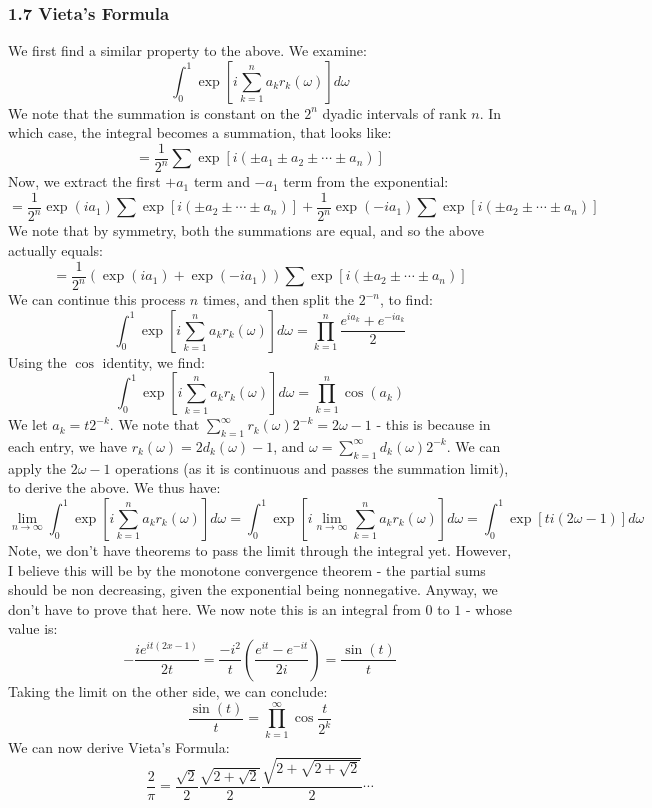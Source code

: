 \documentclass[12pt,a4paper]{article}
\newcommand{\1}[1]{\mathbbm{1}\left\{ #1 \right\}}
\begin{document}
\subsubsection{1.7 Vieta's Formula} We first find a similar property to the above. We examine:
$$
	\int_0^1 \exp\left[i\sum_{k=1}^n a_kr_k(\omega)\right] d\omega
$$
We note that the summation is constant on the $2^n$ dyadic intervals of rank $n$. In which case, the integral becomes a summation, that looks like:
$$
	= \frac{1}{2^n} \sum \exp\left[i\left(\pm a_1 \pm a_2 \pm \cdots \pm a_n\right)\right]
$$
Now, we extract the first $+a_1$ term and $-a_1$ term from the exponential:
$$
	= \frac{1}{2^n} \exp(ia_1) \sum \exp\left[i\left(\pm a_2 \pm \cdots \pm a_n\right)\right] +
	\frac{1}{2^n} \exp(-ia_1) \sum \exp\left[i\left(\pm a_2 \pm \cdots \pm a_n\right)\right]
$$
We note that by symmetry, both the summations are equal, and so the above actually equals:
$$
	= \frac{1}{2^n} \left(\exp(ia_1) + \exp(-ia_1)\right) \sum \exp\left[i\left(\pm a_2 \pm \cdots \pm a_n\right)\right]
$$
We can continue this process $n$ times, and then split the $2^{-n}$, to find:
$$
	\int_0^1 \exp\left[i\sum_{k=1}^n a_kr_k(\omega)\right] d\omega =
	\prod_{k=1}^n \frac{e^{ia_k}+e^{-ia_k}}{2}
$$
Using the $\cos$ identity, we find:
$$
	\int_0^1 \exp\left[i\sum_{k=1}^n a_kr_k(\omega)\right] d\omega =
	\prod_{k=1}^n \cos(a_k)
$$
We let $a_k = t2^{-k}$. We note that $\sum_{k=1}^\infty r_k(\omega)2^{-k} = 2\omega - 1$ - this is because in each entry, we have $r_k(\omega) = 2d_k(\omega) - 1$, and $\omega = \sum_{k=1}^\infty d_k(\omega) 2^{-k}$. We can apply the $2\omega - 1$ operations (as it is continuous and passes the summation limit), to derive the above. We thus have:
$$
	\lim_{n \to \infty} \int_0^1 \exp\left[i\sum_{k=1}^n a_kr_k(\omega)\right] d\omega =
	\int_0^1 \exp\left[i \lim_{n \to \infty}\sum_{k=1}^n a_kr_k(\omega)\right] d\omega =
	\int_0^1 \exp\left[ti (2\omega - 1)\right] d\omega
$$
Note, we don't have theorems to pass the limit through the integral yet. However, I believe this will be by the monotone convergence theorem - the partial sums should be non decreasing, given the exponential being nonnegative. Anyway, we don't have to prove that here. We now note this is an integral from $0$ to $1$ - whose value is:
$$
	- \frac{ie^{it(2x - 1)}}{2t} = \frac{-i^2}{t}\left(\frac{e^{it} - e^{-it}}{2i}\right) = \frac{\sin(t)}{t}
$$
Taking the limit on the other side, we can conclude:
$$
	\frac{\sin(t)}{t} = \prod_{k=1}^\infty \cos \frac{t}{2^k}
$$
We can now derive Vieta's Formula:
$$
	\frac{2}{\pi} = \frac{\sqrt{2}}{2} \frac{\sqrt{2 + \sqrt{2}}}{2} \frac{\sqrt{2 + \sqrt{2 + \sqrt{2}}}}{2} \cdots 
$$
\end{document}
